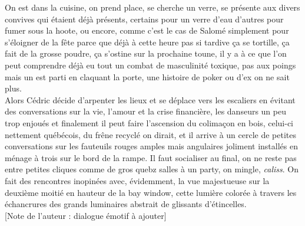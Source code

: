 \documentclass{article}
\begin{document}
\begin{comment}Le Jim
    Bean est un whiskey, un bourbon pour être plus précis, connu comme étant
    typiffiant de l'amérique avec un gros r sale, d'une toxicité masculine, avec
    sa bouteille nettement carrée et son petit coup de coude en fin de gorgée,
il est pas mal quand même.  Et pour le prix, pour le prix\ldots
\end{comment}

\clearpage

On est dans la cuisine, on prend place, se cherche un verre, se présente
aux divers convives qui étaient déjà présents, certains pour un verre d'eau
d'autres pour fumer sous la hoote, ou encore, comme c'est le cas de Salomé
simplement pour s'éloigner de la fête parce que déjà à cette heure pas si
tardive  ça se tortille, ça fait de la grosse poudre, ça s'ostine sur la
prochaine toune, il y a à ce que l'on peut comprendre déjà eu tout
un combat de masculinité toxique, pas aux poings mais un est parti en claquant
la porte, une histoire de poker ou d'ex on ne sait plus.\\

Alors Cédric décide d'arpenter les lieux et se déplace vers les escaliers en
évitant des conversations sur la vie, l'amour et la crise financière, les
danseurs un peu trop enjoués et finalement il peut faire l'ascension du
colimaçon en bois, celui-ci nettement québécois, du frêne recyclé on dirait, et
il arrive à un cercle de petites conversations sur les fauteuils rouges amples
mais angulaires joliment installés en ménage à trois sur le bord de la rampe. Il
faut socialiser au final, on ne reste pas entre petites cliques comme de gros
quebz salles à un party, on mingle, \emph{caliss}. On fait des rencontres
inopinées avec, évidemment, la vue majestueuse sur la deuxième moitié en hauteur
de la bay window, cette lumière colorée à travers les échancrures des grands
luminaires abstrait de glissants d'étincelles.
\\

[Note de l'auteur : dialogue émotif à ajouter]\\[1em]

\clearpage
\end{document}
